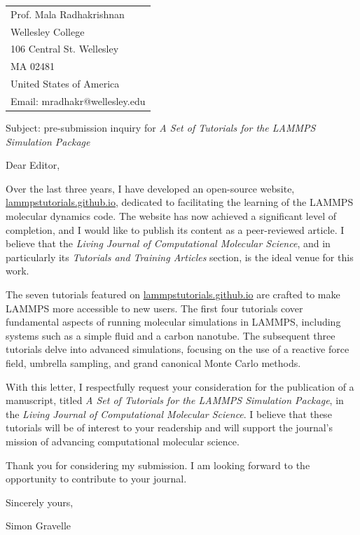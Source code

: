 \documentclass{article}
\begin{document}
\bigskip %


\begin{tabular}{@{} l}
	Prof. Mala Radhakrishnan \\
    Wellesley College \\
    106 Central St. Wellesley \\
    MA 02481\\
    United States of America \\
    Email: mradhakr@wellesley.edu
\end{tabular}

\bigskip 

Subject: pre-submission inquiry for \textit{A Set of Tutorials for the LAMMPS Simulation Package}

\bigskip 

Dear Editor,

\bigskip 

Over the last three years, I have developed an open-source website, \href{https://lammpstutorials.github.io/}{lammpstutorials.github.io}, dedicated  to facilitating the learning of the LAMMPS molecular dynamics code. The website has now achieved a significant level of completion, and I would like to publish its content as a peer-reviewed article. I believe that the \textit{Living Journal of Computational Molecular Science}, and in particularly its \textit{Tutorials and Training Articles} section, is the ideal venue for this work.

The seven tutorials featured on \href{https://lammpstutorials.github.io/}{lammpstutorials.github.io} are crafted to make LAMMPS more accessible to new users. The first four tutorials cover fundamental aspects of running molecular simulations in LAMMPS, including systems such as a simple fluid and a carbon nanotube. The subsequent three tutorials delve into advanced simulations, focusing on the use of a reactive force field, umbrella sampling, and grand canonical Monte Carlo methods.

With this letter, I respectfully request your consideration for the publication of a manuscript, titled \textit{A Set of Tutorials for the LAMMPS Simulation Package}, in the \textit{Living Journal of Computational Molecular Science}. I believe that these tutorials will be of interest to your readership and will support the journal's mission of advancing computational molecular science.

Thank you for considering my submission. I am looking forward to the opportunity to contribute to your journal.

\bigskip %

Sincerely yours,

\bigskip %

Simon Gravelle
\end{document}
